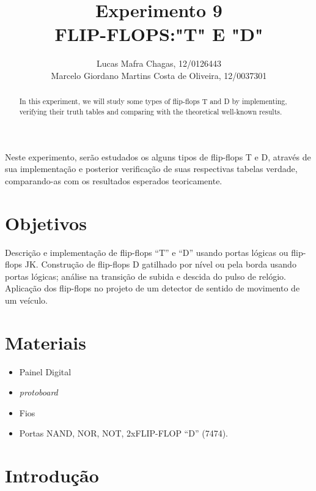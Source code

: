 \documentclass[12pt]{article}
\title{Experimento 9\\ 
	FLIP-FLOPS:"T" E "D"}
\author{
	Lucas Mafra Chagas, 12/0126443 \\
	Marcelo Giordano Martins Costa de Oliveira,  12/0037301
}
\begin{document}
 

\maketitle

 \begin{abstract}
	 In this experiment, we will study some types of flip-flops T and D by implementing, verifying their truth tables and comparing with the theoretical well-known results.
 \end{abstract}
     
 \begin{resumo} 
	 Neste experimento, serão estudados os alguns tipos de flip-flops T e D, através de sua implementação e posterior verificação de suas respectivas tabelas verdade, comparando-as com os resultados esperados teoricamente.
 \end{resumo}


\section{Objetivos}
\label{sec:Objetivos}

Descrição e implementação de flip-flops “T” e “D” usando portas lógicas ou flip-flops JK. Construção de flip-flops D gatilhado por nível ou pela borda usando portas lógicas; análise na transição de subida e descida do pulso de relógio. Aplicação dos flip-flops no projeto de um detector de sentido de movimento de um veículo.

\section{Materiais} 
\label{sec:Materiais}

\begin{itemize}
    \item Painel Digital
    
    \item \textit{protoboard}
    
    \item Fios
    
    \item Portas NAND, NOR, NOT, 2xFLIP-FLOP “D” (7474).
    
\end{itemize}


\section{Introdução}
\label{sec:Introducao}
\end{document}
